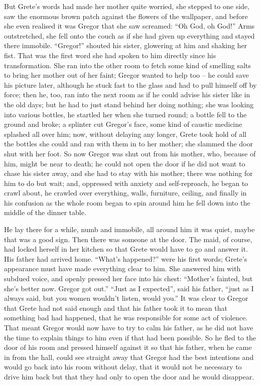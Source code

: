 But Grete’s words had made her mother quite worried, she stepped to one
side, saw the enormous brown patch against the flowers of the
wallpaper, and before she even realised it was Gregor that she saw
screamed: “Oh God, oh God!” Arms outstretched, she fell onto the couch
as if she had given up everything and stayed there immobile. “Gregor!”
shouted his sister, glowering at him and shaking her fist. That was the
first word she had spoken to him directly since his transformation. She
ran into the other room to fetch some kind of smelling salts to bring
her mother out of her faint; Gregor wanted to help too – he could save
his picture later, although he stuck fast to the glass and had to pull
himself off by force; then he, too, ran into the next room as if he
could advise his sister like in the old days; but he had to just stand
behind her doing nothing; she was looking into various bottles, he
startled her when she turned round; a bottle fell to the ground and
broke; a splinter cut Gregor’s face, some kind of caustic medicine
splashed all over him; now, without delaying any longer, Grete took
hold of all the bottles she could and ran with them in to her mother;
she slammed the door shut with her foot. So now Gregor was shut out
from his mother, who, because of him, might be near to death; he could
not open the door if he did not want to chase his sister away, and she
had to stay with his mother; there was nothing for him to do but wait;
and, oppressed with anxiety and self-reproach, he began to crawl about,
he crawled over everything, walls, furniture, ceiling, and finally in
his confusion as the whole room began to spin around him he fell down
into the middle of the dinner table.

He lay there for a while, numb and immobile, all around him it was
quiet, maybe that was a good sign. Then there was someone at the door.
The maid, of course, had locked herself in her kitchen so that Grete
would have to go and answer it. His father had arrived home. “What’s
happened?” were his first words; Grete’s appearance must have made
everything clear to him. She answered him with subdued voice, and
openly pressed her face into his chest: “Mother’s fainted, but she’s
better now. Gregor got out.” “Just as I expected”, said his father,
“just as I always said, but you women wouldn’t listen, would you.” It
was clear to Gregor that Grete had not said enough and that his father
took it to mean that something bad had happened, that he was
responsible for some act of violence. That meant Gregor would now have
to try to calm his father, as he did not have the time to explain
things to him even if that had been possible. So he fled to the door of
his room and pressed himself against it so that his father, when he
came in from the hall, could see straight away that Gregor had the best
intentions and would go back into his room without delay, that it would
not be necessary to drive him back but that they had only to open the
door and he would disappear.

